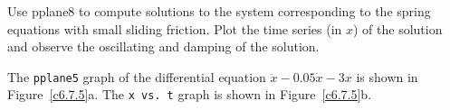 \documentclass{ximera}
\begin{document}
\begin{exercise} \label{c6.7.5}
Use {\sf pplane8} to compute solutions to the system corresponding to the
spring equations with small sliding friction.  Plot the time series (in $x$)
of the solution and observe the oscillating and damping of the solution.

\begin{solution}

The {\tt pplane5} graph of the differential equation
$\ddot{x} - 0.05\dot{x} - 3x$ is shown in Figure~\ref{c6.7.5}a.  The
{\tt x vs.\ t} graph is shown in Figure~\ref{c6.7.5}b.

\begin{figure}[htb]
                       \centerline{%
                       }
\end{figure}























\end{solution}
\end{exercise}
\end{document}
